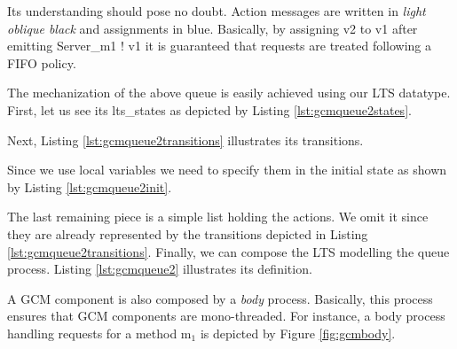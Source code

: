 	\noindent Its understanding should pose no doubt. \textsf{Action} \textsf{messages} are written
	in \textit{light oblique black} and \textsf{assignments} in blue. Basically, by assigning \textsf{v2} to
	\textsf{v1} after emitting \textsf{Server\_m1 ! v1} it is guaranteed that requests are treated following
	a \ac{FIFO} policy.
		
	
		The mechanization of the above queue is easily achieved using our \textsf{LTS} datatype. First,
		let us see its \textsf{lts\_states} as depicted by Listing \ref{lst:gcmqueue2states}.
		
				
	   			
	   
   	\noindent Next, Listing \ref{lst:gcmqueue2transitions} illustrates its \textsf{transitions}.
   	
   	 		
 	
 	
	\noindent  Since we use local variables we need to specify them in the initial state as
	shown by Listing \ref{lst:gcmqueue2init}.	
	 	
 	   	 		


	\noindent The last remaining piece is a simple list holding the \textsf{actions}. We omit it
	since they are already represented by the \textsf{transitions} depicted in Listing \ref{lst:gcmqueue2transitions}.
	Finally, we can compose the \textsf{LTS} modelling the queue process. Listing \ref{lst:gcmqueue2}
	illustrates its definition.
	
		


	\noindent A \ac{GCM} component is also composed by a \textit{body} process. Basically, this process
	ensures that \ac{GCM} components are mono-threaded. For instance, a body process handling
	requests for a method \textsf{m$_1$} is depicted by Figure \ref{fig:gcmbody}.


